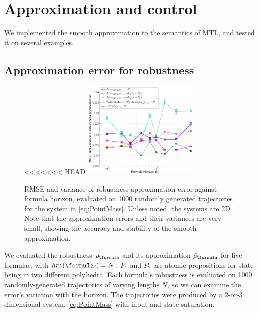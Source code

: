 \section{Approximation and control}
\label{sec:examples}
We implemented the smooth approximation to the semantics of MTL, and tested it on several examples.

\subsection{Approximation error for robustness}
\label{sec: ex apx error}
\begin{figure}[t]
\centering
<<<<<<< HEAD
\includegraphics[width=0.49\textwidth]{figures/RobustnessError_corrected_scissored}
\vspace{-20pt}
\caption{{\small RMSE and variance of robustness approximation error against formula horizon, evaluated on 1000 randomly generated trajectories for the system in \eqref{eq:PointMass}. Unless noted, the systems are 2D. Note that the approximation errors and their variances are very small, showing the accuracy and stability of the smooth approximation.}}
\vspace{-10pt}
\label{fig:sample result}
\end{figure}

We evaluated the robustness $\robf$ and its approximation $\srobf$ for five formulae, with $hrz(\formula_i) = N$. $P_1$ and $P_2$ are atomic propositions for state being in two different polyhedra.
Each formula's robustness is evaluated on 1000 randomly-generated trajectories of varying lengths $N$, so we can  examine the error's variation with the horizon.
The trajectories were produced by a 2-or-3 dimensional system, \eqref{eq:PointMass} with input and state saturation.

